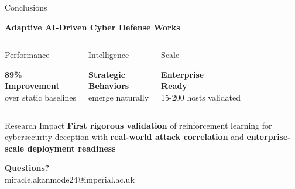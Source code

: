 \documentclass[aspectratio=169,xcolor=dvipsnames]{beamer}
\begin{document}
\begin{frame}{Conclusions}
\begin{center}
{\Large\textbf{\textcolor{ImperialNavy}{Adaptive AI-Driven Cyber Defense Works}}}
\end{center}

\begin{columns}[c]
\begin{block}{\textcolor{cwAlert}{Performance}}
\begin{center}
{\huge\textbf{89\%}}\\
\textbf{Improvement}\\
over static baselines
\end{center}
\end{block}

\begin{block}{\textcolor{cwFlow}{Intelligence}}
\begin{center}
\textbf{Strategic}\\
\textbf{Behaviors}\\
emerge naturally
\end{center}
\end{block}

\begin{block}{\textcolor{cwDecoy}{Scale}}
\begin{center}
\textbf{Enterprise}\\
\textbf{Ready}\\
15-200 hosts validated
\end{center}
\end{block}
\end{columns}

\vspace{0.5cm}

\begin{alertblock}{Research Impact}
\textbf{First rigorous validation} of reinforcement learning for cybersecurity deception with \textbf{real-world attack correlation} and \textbf{enterprise-scale deployment readiness}
\end{alertblock}

\vspace{0.3cm}
\begin{center}
\textcolor{ImperialBlue}{\textbf{Questions?}}\\
\textcolor{ImperialBlue}{miracle.akanmode24@imperial.ac.uk}
\end{center}
\end{frame}
\end{document}
